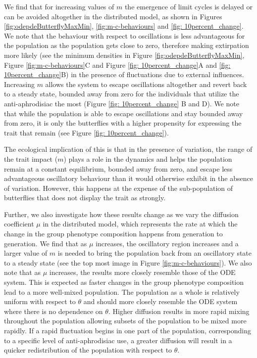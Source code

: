 \documentclass[review,authoryear]{elsarticle}
\newcommand{\origTheta}{{\theta}}
\newcommand{\origM}{m}
\begin{document}
We find that for increasing values of $\origM$ the emergence of limit cycles is delayed or can be avoided altogether in the distributed model, as shown in Figures \ref{fig:odepdeButterflyMaxMin}, \ref{fig:m-c-behaviours} and \ref{fig: 10percent_change}. 
We note that the behaviour with respect to oscillations is less advantageous for the population as the population gets close to zero, therefore making extirpation more likely (see the minimum densities in Figure \ref{fig:odepdeButterflyMaxMin}, Figure \ref{fig:m-c-behaviours}C and Figure \ref{fig: 10percent_change}A and \ref{fig: 10percent_change}B) in the presence of fluctuations due to external influences. Increasing $\origM$ allows the system to escape oscillations altogether and revert back to a steady state, bounded away from zero for the individuals that utilize the anti-aphrodisiac the most (Figure \ref{fig: 10percent_change} B and D). We note that while the population is able to escape oscillations and stay bounded away from zero, it is only the butterflies with a higher propensity for expressing the trait that remain (see Figure \ref{fig: 10percent_change}). 

The ecological implication of this is that in the presence of variation, the range of the trait impact ($\origM$) plays
a role in the dynamics and helps the population remain at a constant equilibrium, bounded away from zero, and escape less advantageous oscillatory behaviour than it would otherwise exhibit in the absence of variation. However, this happens at the expense of the
sub-population of butterflies that does not display the trait as strongly.

\par Further, we also investigate how these results change as we vary the diffusion coefficient $\mu$ in the distributed model, which represents the rate at which the change in the group phenotype composition happens from generation to generation. 
We find that as $\mu$ increases, the oscillatory region increases and a larger value of $\origM$ is needed to bring the population back from an oscillatory state to a steady state (see the top most image in Figure \ref{fig:m-c-behaviours}).  
We also note that as $\mu$ increases, the results more closely resemble those of the ODE system. This is expected as faster changes in the group phenotype composition lead to a more well-mixed population. The population as a whole is relatively uniform with respect to $\theta$ and should more closely resemble the ODE system where there is no dependence on $\theta$. Higher diffusion results in more rapid mixing throughout the population allowing subsets of the population to be mixed more rapidly. If a rapid fluctuation begins in one part of the population, corresponding to a specific level of anti-aphrodisiac use, a greater diffusion will result in a quicker redistribution of the population with respect to  $\origTheta$. 
\end{document}
